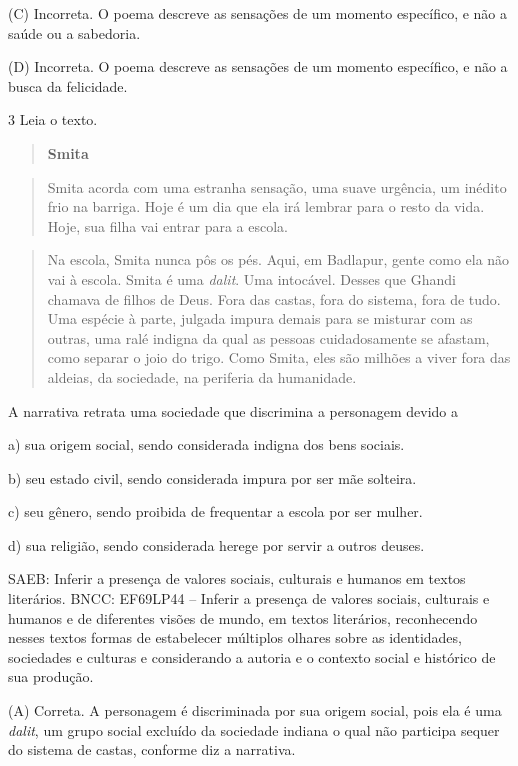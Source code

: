 (C) Incorreta. O poema descreve as sensações de um momento específico, e
não a saúde ou a sabedoria.

(D) Incorreta. O poema descreve as sensações de um momento específico, e
não a busca da felicidade.

\num{3} Leia o texto.

\begin{quote}
\textbf{Smita}
\end{quote}

\begin{quote}
Smita acorda com uma estranha sensação, uma suave urgência, um inédito
frio na barriga. Hoje é um dia que ela irá lembrar para o resto da vida.
Hoje, sua filha vai entrar para a escola.
\end{quote}

\begin{quote}
Na escola, Smita nunca pôs os pés. Aqui, em Badlapur, gente como ela não
vai à escola. Smita é uma \emph{dalit}. Uma intocável. Desses que Ghandi
chamava de filhos de Deus. Fora das castas, fora do sistema, fora de
tudo. Uma espécie à parte, julgada impura demais para se misturar com as
outras, uma ralé indigna da qual as pessoas cuidadosamente se afastam,
como separar o joio do trigo. Como Smita, eles são milhões a viver fora
das aldeias, da sociedade, na periferia da humanidade.
\end{quote}


A narrativa retrata uma sociedade que discrimina a personagem devido a

a) sua origem social, sendo considerada indigna dos bens sociais.

b) seu estado civil, sendo considerada impura por ser mãe solteira.

c) seu gênero, sendo proibida de frequentar a escola por ser mulher.

d) sua religião, sendo considerada herege por servir a outros deuses.

SAEB: Inferir a presença de valores sociais, culturais e humanos em
textos literários. BNCC: EF69LP44 -- Inferir a presença de valores
sociais, culturais e humanos e de diferentes visões de mundo, em textos
literários, reconhecendo nesses textos formas de estabelecer múltiplos
olhares sobre as identidades, sociedades e culturas e considerando a
autoria e o contexto social e histórico de sua produção.

(A) Correta. A personagem é discriminada por sua origem social, pois ela
é uma \emph{dalit}, um grupo social excluído da sociedade indiana o qual
não participa sequer do sistema de castas, conforme diz a narrativa.

